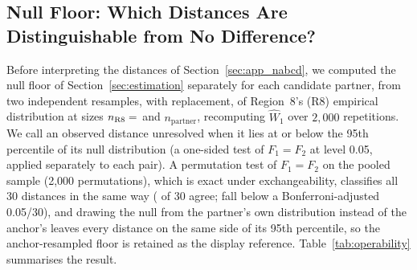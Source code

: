 \documentclass[AMA,Times1COL]{WileyNJDv5}
\begin{document}
\subsection{Null Floor: Which Distances Are Distinguishable from No Difference?}\label{sec:app_operability}

Before interpreting the distances of Section~\ref{sec:app_nabcd}, we computed the null floor of Section~\ref{sec:estimation} separately for each candidate partner, from two independent resamples, with replacement, of Region~8's (R8) empirical distribution at sizes $n_{\text{R8}} = \numval{nR8floor}$ and $n_{\text{partner}}$, recomputing $\widehat{W}_1$ over $2{,}000$ repetitions. We call an observed distance unresolved when it lies at or below the 95th percentile of its null distribution (a one-sided test of $F_1 = F_2$ at level 0.05, applied separately to each pair). A permutation test of $F_1 = F_2$ on the pooled sample (2{,}000 permutations), which is exact under exchangeability, classifies all 30 distances in the same way ( of 30 agree;  fall below a Bonferroni-adjusted 0.05/30), and drawing the null from the partner's own distribution instead of the anchor's leaves every distance on the same side of its 95th percentile, so the anchor-resampled floor is retained as the display reference. Table~\ref{tab:operability} summarises the result.

\begin{table}[ht]
\centering
\caption{Null floor of $\widehat{W}_1$ across the 15 candidate partners, by effect modifier. Ranges are across partners; the floor depends on each partner's sample size. Unresolved distances are those whose observed $\widehat{W}_1$ falls at or below the 95th percentile of the null distribution.\label{tab:operability}}
\end{table}
\end{document}
